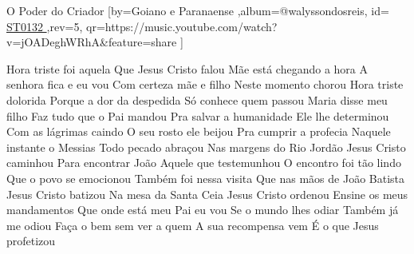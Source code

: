 \beginsong
{O Poder do Criador %
}[by={Goiano e Paranaense %
},album={@walyssondosreis},
id={\href{https://music.youtube.com/watch?v=jOADeghWRhA&feature=share
}{ ST0132 %
}},rev={5}, %
qr={https://music.youtube.com/watch?v=jOADeghWRhA&feature=share %
}]

\beginverse 
 Hora triste foi aquela
Que Jesus Cristo falou
 Mãe está chegando a hora
A senhora fica e eu vou
 Com certeza mãe e filho
Neste momento chorou
 Hora triste dolorida 
Porque a dor da despedida
Só conhece quem passou
\endverse
{}
\beginverse
 Maria disse meu filho 
Faz tudo que o Pai mandou
 Pra salvar a humanidade
Ele lhe determinou
 Com as lágrimas caindo
O seu rosto ele beijou
 Pra cumprir a profecia 
Naquele instante o Messias
Todo pecado abraçou
\endverse
{}
\beginverse
 Nas margens do Rio Jordão
Jesus Cristo caminhou
 Para encontrar João
Aquele que testemunhou
 O encontro foi tão lindo
Que o povo se emocionou
 Também foi nessa visita
Que nas mãos de João Batista
Jesus Cristo batizou
\endverse
{}
\beginverse
 Na mesa da Santa Ceia
Jesus Cristo ordenou
 Ensine os meus mandamentos
Que onde está meu Pai eu vou
 Se o mundo lhes odiar
Também já me odiou
 Faça o bem sem ver a quem 
A sua recompensa vem
É o que Jesus profetizou
\endverse

\vspace{4em} %

\endsong
